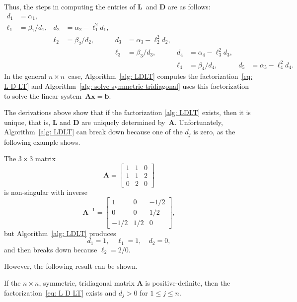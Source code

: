 Thus, the steps in computing the entries of $\boldsymbol{L}$~and 
$\boldsymbol{D}$ are as follows:
\begin{align*}
         d_1&=\alpha_1,   &   &                      &&&&&&\\
      \ell_1&=\beta_1/d_1,&d_2&=\alpha_2-\ell_1^2d_1,&&&&&&\\
    &&\ell_2&=\beta_2/d_2,&d_3&=\alpha_3-\ell_2^2d_2,&&&&\\
  &&&&\ell_3&=\beta_3/d_3,&d_4&=\alpha_4-\ell_3^2d_3,&&\\
&&&&&&\ell_4&=\beta_4/d_4,&d_5&=\alpha_5-\ell_4^2d_4.
\end{align*}
In the general $n\times n$~case,
Algorithm~\ref{alg: LDLT} computes the factorization~\eqref{eq: L D LT}
and Algorithm~\ref{alg: solve symmetric tridiagonal} 
uses this factorization to solve the linear 
system~$\boldsymbol{A}\boldsymbol{x}=\boldsymbol{b}$. 

The derivations above show that if the factorization \eqref{alg: LDLT} exists,
then it is unique, that is, $\boldsymbol{L}$ and $\boldsymbol{D}$ are uniquely 
determined by~$\boldsymbol{A}$.  Unfortunately,
Algorithm~\ref{alg: LDLT} can break down because one of the $d_j$ is zero, as 
the following example shows.

\begin{example}
The $3\times3$ matrix
\[
\boldsymbol{A}=\begin{bmatrix}1&1&0\\1&1&2\\ 0&2&0 \end{bmatrix}
\]
is non-singular with inverse
\[
\boldsymbol{A}^{-1}=\begin{bmatrix}1&0&-1/2\\ 0&0&1/2\\ -1/2&1/2&0\end{bmatrix},
\]
but Algorithm~\ref{alg: LDLT} produces
\[
d_1=1,\quad \ell_1=1,\quad d_2=0,
\]
and then breaks down because $\ell_2=2/0$.
\end{example}

However, the following result can be shown.

\begin{theorem}
If the $n\times n$, symmetric, tridiagonal matrix $\boldsymbol{A}$ is 
positive-definite, then the factorization~\eqref{eq: L D LT} exists and $d_j>0$ 
for $1\le j\le n$.
\end{theorem}

